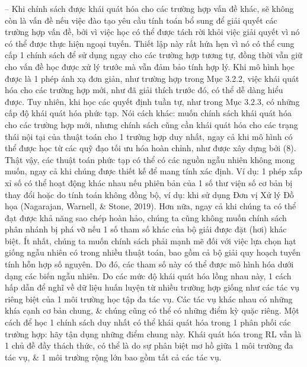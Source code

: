 \documentclass{article}
\begin{document}
\begin{itemize}
\begin{itemize}
        -- Khi chính sách được khái quát hóa cho các trường hợp vấn đề khác, sẽ không còn là vấn đề nếu việc đào tạo yêu cầu tính toán bổ sung để giải quyết các trường hợp vấn đề, bởi vì việc học có thể được tách rời khỏi việc giải quyết vì nó có thể được thực hiện ngoại tuyến. Thiết lập này rất hứa hẹn vì nó có thể cung cấp 1 chính sách để sử dụng ngay cho các trường hợp tương tự, đồng thời vẫn giữ cho vấn đề học được xử lý trước mà vẫn đảm bảo tính hợp lý. Khi mô hình học được là 1 phép ánh xạ đơn giản, như trường hợp trong Mục 3.2.2, việc khái quát hóa cho các trường hợp mới, như đã giải thích trước đó, có thể dễ dàng hiểu được. Tuy nhiên, khi học các quyết định tuần tự, như trong Mục 3.2.3, có những cấp độ khái quát hóa phức tạp. Nói cách khác: muốn chính sách khái quát hóa cho các trường hợp mới, nhưng chính sách cũng cần khái quát hóa cho các trạng thái nội tại của thuật toán cho 1 trường hợp duy nhất, ngay cả khi mô hình có thể được học từ các quỹ đạo tối ưu hóa hoàn chỉnh, như được xây dựng bởi (8). Thật vậy, các thuật toán phức tạp có thể có các nguồn ngẫu nhiên không mong muốn, ngay cả khi chúng được thiết kế để mang tính xác định. Ví dụ: 1 phép xấp xỉ số có thể hoạt động khác nhau nếu phiên bản của 1 số thư viện số cơ bản bị thay đổi hoặc do tính toán không đồng bộ, ví dụ: khi sử dụng Đơn vị Xử lý Đồ họa (Nagarajan, Warnell, \& Stone, 2019). Hơn nữa, ngay cả khi chúng ta có thể đạt được khả năng sao chép hoàn hảo, chúng ta cũng không muốn chính sách phân nhánh bị phá vỡ nếu 1 số tham số khác của bộ giải được đặt (hơi) khác biệt. Ít nhất, chúng ta muốn chính sách phải mạnh mẽ đối với việc lựa chọn hạt giống ngẫu nhiên có trong nhiều thuật toán, bao gồm cả bộ giải quy hoạch tuyến tính hỗn hợp số nguyên. Do đó, các tham số này có thể được mô hình hóa dưới dạng các biến ngẫu nhiên. Do các mức độ khái quát hóa lồng nhau này, 1 cách hấp dẫn để nghĩ về dữ liệu huấn luyện từ nhiều trường hợp giống như các tác vụ riêng biệt của 1 môi trường học tập đa tác vụ. Các tác vụ khác nhau có những khía cạnh cơ bản chung, \& chúng cũng có thể có những điểm kỳ quặc riêng. Một cách để học 1 chính sách duy nhất có thể khái quát hóa trong 1 phân phối các trường hợp: hãy tận dụng những điểm chung này. Khái quát hóa trong RL vẫn là 1 chủ đề đầy thách thức, có thể là do sự phân biệt mơ hồ giữa 1 môi trường đa tác vụ, \& 1 môi trường rộng lớn bao gồm tất cả các tác vụ.


\end{itemize}
\end{itemize}
\end{document}
